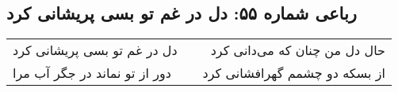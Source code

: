 \begin{center}
\section*{رباعی شماره ۵۵: دل در غم تو بسی پریشانی کرد}
\label{sec:055}
\begin{longtable}{l p{0.5cm} r}
دل در غم تو بسی پریشانی کرد
&&
حال دل من چنان که می‌دانی کرد
\\
دور از تو نماند در جگر آب مرا
&&
از بسکه دو چشمم گهرافشانی کرد
\\
\end{longtable}
\end{center}
